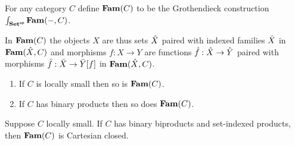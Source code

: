 \begin{definition}
For any category $C$ define $\mathbf{Fam}(C)$ to be the Grothendieck construction
$\int_{\mathbf{Set}^{\mathsf{op}}}\mathbf{Fam}(-,C)$.
\end{definition}

\noindent In $\mathbf{Fam}(C)$ the objects $X$ are thus sets $\hat{X}$ paired with indexed families $\bar{X}$ in
$\mathbf{Fam}(\hat{X},C)$ and morphisms $f: X \to Y$ are functions $\hat{f}: \hat{X} \to \hat{Y}$ paired with
morphisms $\bar{f}: \bar{X} \to \bar{Y}[f]$ in $\mathbf{Fam}(\hat{X},C)$.

\begin{proposition}
\item
\begin{enumerate}
\item If $C$ is locally small then so is $\mathbf{Fam}(C)$.
\item If $C$ has binary products then so does $\mathbf{Fam}(C)$.
\end{enumerate}
\end{proposition}

\begin{proposition}
Suppose $C$ locally small. If $C$ has binary biproducts and set-indexed products, then $\mathbf{Fam}(C)$ is Cartesian
closed. 
\end{proposition}


